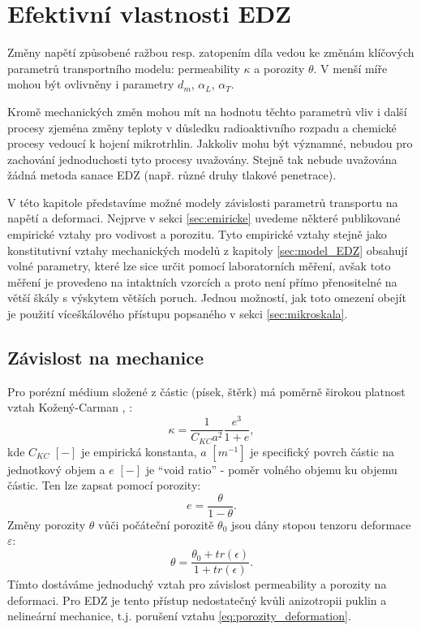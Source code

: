 \documentclass{article}
\def\eps{\varepsilon}
\begin{document}
\section{Efektivní vlastnosti EDZ}
\label{sec:micro_EDZ}
Změny napětí způsobené ražbou resp. zatopením díla vedou ke změnám klíčových parametrů transportního modelu:
permeability $\kappa$ a porozity $\theta$. V menší míře mohou být ovlivněny i parametry $d_m$, $\alpha_L$, $\alpha_T$.

Kromě mechanických změn mohou mít na hodnotu těchto parametrů vliv i další procesy zjeména změny teploty v důsledku radioaktivního rozpadu a 
chemické procesy vedoucí k hojení mikrotrhlin. Jakkoliv mohu být významné, nebudou pro zachování jednoduchosti tyto procesy uvažovány.
Stejně tak nebude uvažována žádná metoda sanace EDZ (např. různé druhy tlakové penetrace).

V této kapitole představíme možné modely závislosti parametrů transportu na napětí a deformaci.
Nejprve v sekci \ref{sec:emiricke} uvedeme některé publikované empirické vztahy pro vodivost a porozitu.
Tyto empirické vztahy stejně jako konstitutivní vztahy mechanických modelů z kapitoly \ref{sec:model_EDZ} 
obsahují volné parametry, které lze sice určit pomocí laboratorních měření, avšak toto měření je provedeno na intaktních vzorcích
a proto není přímo přenositelné na větší škály s výskytem větších poruch. Jednou možností, jak toto omezení obejít je
použití víceškálového přístupu popsaného v sekci  \ref{sec:mikroskala}.


\subsection{Závislost na mechanice}
\label{sec:empiricke}

Pro porézní médium složené z částic (písek, štěrk) má poměrně širokou platnost vztah Kožený-Carman \cite{Carman1956}, \cite{Carrier2003}:
\begin{equation}
  \label{eq:Kozeny}
  \kappa = \frac{1}{C_{KC}a^2}\frac{e^3}{1+e},
\end{equation}
kde $C_{KC}$ $[-]$ je empirická konstanta, $a$  $[m^{-1}]$ je specifický povrch částic na jednotkový objem a $e$ $[-]$ je  ``void ratio'' -
poměr volného objemu ku objemu částic. Ten lze zapsat pomocí porozity:
\[
   e = \frac{\theta}{1 - \theta}.
\]
Změny porozity $\theta$ vůči počáteční porozitě $\theta_0$ jsou dány stopou tenzoru deformace $\eps$:
\begin{equation}
   \label{eq:porozity_deformation}
   \theta = \frac{\theta_0 + tr(\epsilon)}{1 + tr(\epsilon)}.
\end{equation}
Tímto dostáváme jednoduchý vztah pro závislost permeability a porozity na deformaci. Pro EDZ je tento přístup nedostatečný kvůli anizotropii
puklin a nelineární mechanice, t.j.  porušení vztahu \eqref{eq:porozity_deformation}.
\end{document}
